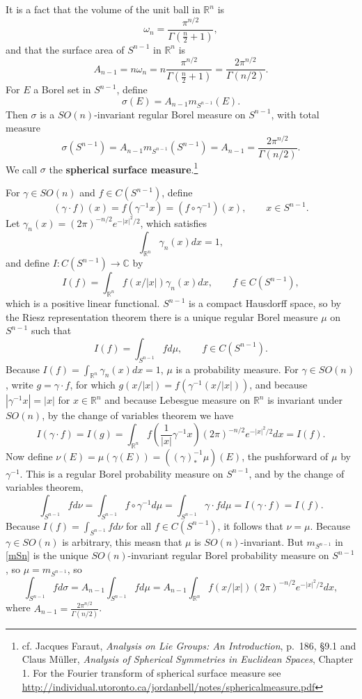 \documentclass{article}
\theoremstyle{definition}
\begin{document}
It is a fact that  the volume of the unit ball in $\mathbb{R}^n$ is
\[
\omega_n = \frac{\pi^{n/2}}{\Gamma\left(\frac{n}{2}+1\right)},
\]
and that 
the surface area of $S^{n-1}$ in $\mathbb{R}^n$ is
\[
A_{n-1}= n \omega_n = n \frac{\pi^{n/2}}{\Gamma\left(\frac{n}{2}+1\right)} 
=\frac{2\pi^{n/2}}{\Gamma(n/2)}.
\]
For $E$ a Borel set in $S^{n-1}$, define
\[
\sigma(E) = A_{n-1} m_{S^{n-1}}(E).
\]
Then $\sigma$ is a $SO(n)$-invariant regular Borel measure on $S^{n-1}$, with total measure
\[
\sigma(S^{n-1}) = A_{n-1} m_{S^{n-1}}(S^{n-1}) = 
A_{n-1} = \frac{2\pi^{n/2}}{\Gamma(n/2)}.
\]
We call $\sigma$ the \textbf{spherical surface measure}.\footnote{cf. Jacques Faraut, 
{\em Analysis on Lie Groups: An Introduction}, p.~186, \S 9.1 
and Claus M\"uller, 
{\em Analysis of Spherical Symmetries in Euclidean Spaces},
Chapter 1. For the Fourier transform of spherical surface measure see \url{http://individual.utoronto.ca/jordanbell/notes/sphericalmeasure.pdf}}


For $\gamma \in SO(n)$ and $f \in C(S^{n-1})$, define
\[
(\gamma \cdot f)(x) = f(\gamma^{-1} x)=(f \circ \gamma^{-1})(x),\qquad x \in S^{n-1}.
\]
Let $\gamma_n(x) = (2\pi)^{-n/2} e^{-|x|^2/2}$, which satisfies
\[
\int_{\mathbb{R}^n} \gamma_n(x) dx = 1,
\]
and define $I:C(S^{n-1}) \to \mathbb{C}$ by
\[
I(f)= \int_{\mathbb{R}^n} f(x/|x|) \gamma_n(x) dx, \qquad f \in C(S^{n-1}),
\]
which is a positive linear functional.
$S^{n-1}$ is a compact Hausdorff space, so by the Riesz representation theorem there is a unique regular Borel measure
$\mu$ on $S^{n-1}$ such that 
\[
I(f) = \int_{S^{n-1}} f d\mu,\qquad f \in C(S^{n-1}).
\]
Because $I(f) = \int_{\mathbb{R}^n} \gamma_n(x) dx = 1$, $\mu$ is a probability measure. For $\gamma \in SO(n)$,
write
$g= \gamma \cdot f$, for which 
$g(x/|x|) = f(\gamma^{-1} (x/|x|))$, and because $|\gamma^{-1} x|=|x|$ for $x \in \mathbb{R}^n$ and because Lebesgue measure on $\mathbb{R}^n$
is invariant under $SO(n)$, by the change of variables
theorem we have
\[
I(\gamma \cdot f) = I(g) = \int_{\mathbb{R}^n} f\left(\frac{1}{|x|} \gamma^{-1} x\right)  (2\pi)^{-n/2} e^{-|x|^2/2} dx
=I(f).
\]
Now define $\nu(E) = \mu(\gamma(E))=((\gamma)^{-1}_* \mu)(E)$, the pushforward of $\mu$ by $\gamma^{-1}$.  This is a regular Borel probability measure on $S^{n-1}$, and by the
change of variables theorem,
\[
\int_{S^{n-1}} f d\nu = \int_{S^{n-1}} f \circ \gamma^{-1} d\mu = 
\int_{S^{n-1}} \gamma \cdot f d\mu
=I(\gamma \cdot f) = I(f).
\]
Because $I(f) = \int_{S^{n-1}} f d\nu$ for all $f \in C(S^{n-1})$, it follows that $\nu = \mu$. 
Because $\gamma \in SO(n)$ is arbitrary, this measn that $\mu$ is $SO(n)$-invariant. 
But $m_{S^{n-1}}$ in \eqref{mSn} is the unique $SO(n)$-invariant regular Borel probability measure on $S^{n-1}$, so
$\mu = m_{S^{n-1}}$, so
\[
\int_{S^{n-1}} f d\sigma = A_{n-1} \int_{S^{n-1}} f d\mu
=A_{n-1} \int_{\mathbb{R}^n} f(x/|x|) (2\pi)^{-n/2} e^{-|x|^2/2} dx,
\]
where $A_{n-1} = \frac{2\pi^{n/2}}{\Gamma(n/2)}$.
\end{document}

